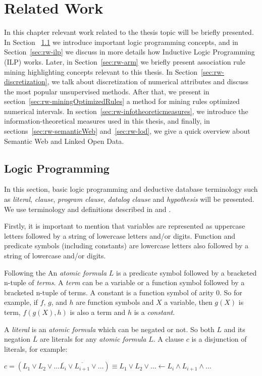 \chapter{Related Work}
\label{sec:rw-intro}

In this chapter relevant work related to the thesis topic will be briefly presented. In Section 
~\ref{sec:rw-lp} we introduce important logic programming concepts, and in Section~\ref{sec:rw-ilp} we discuss in
more details how Inductive Logic Programming (ILP) works. Later, in Section~\ref{sec:rw-arm} we briefly present
association rule mining highlighting concepts relevant to this thesis. In Section~\ref{sec:rw-discretization}, we
talk about discretization of numerical attributes and discuss the most popular unsupervised methods. After that, we
present in section~\ref{sec:rw-miningOptimizedRules} a method for mining rules optimized numerical intervals. In
section~\ref{sec:rw-infotheoreticmeasures}, we introduce the information-theoretical measures used in this thesis,
and finally, in sections~\ref{sec:rw-semanticWeb} and~\ref{sec:rw-lod}, we give a quick overview about Semantic Web
and Linked Open Data.


\section{Logic Programming}
\label{sec:rw-lp}

In this section, basic logic programming and deductive database terminology such as \emph{literal}, \emph{clause},
\emph{program clause}, \emph{datalog clause} and \emph{hypothesis} will be presented. We use terminology and
definitions described in \citet{DBLP:books/sp/Lloyd87} and \citet{LavracDz94}.

Firstly, it is important to
mention that variables are represented as uppercase letters followed by a string of lowercase letters and/or digits.
Function and predicate symbols (including constants) are lowercase letters also followed by a string of lowercase and/or
digits.

Following the An \emph{atomic formula} $L$ is a predicate symbol followed by a bracketed n-tuple of \emph{terms}. A
\emph{term} can
be
a variable or a function symbol followed by a bracketed n-tuple of terms. A constant is a function symbol of arity 0.
So
for example, if $f$, $g$, and $h$ are function symbols and $X$ a variable, then $g(X)$ is term, $f(g(X),h)$ is also a
term and $h$ is a \emph{constant}.

A \emph{literal} is an \emph{atomic formula} which can be negated or not. So both $L$ and its negation $\overline{L}$
are literals for any \emph{atomic formula} $L$. A clause $c$ is a disjunction of literals, for example:
\begin{center}
  $c=(L_1 \vee L_2 \vee \ldots \overline{L_{i}} \vee \overline{L_{i+1}} \vee \ldots) \equiv
 L_1 \vee L_2 \vee \ldots \leftarrow L_i \wedge L_{i+1} \wedge \ldots$
\end{center}


